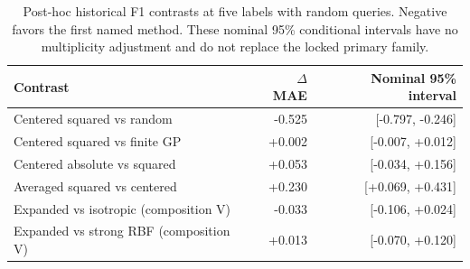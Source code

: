 \begin{table}[htbp]\centering\small
\caption{Post-hoc historical F1 contrasts at five labels with random queries. Negative favors the first named method. These nominal 95\% conditional intervals have no multiplicity adjustment and do not replace the locked primary family.}\label{tab:step10secondary}
\begin{tabular}{lrr}\toprule
Contrast & $\Delta$ MAE & Nominal 95\% interval \\ \midrule
Centered squared vs random & -0.525 & [-0.797, -0.246] \\
Centered squared vs finite GP & +0.002 & [-0.007, +0.012] \\
Centered absolute vs squared & +0.053 & [-0.034, +0.156] \\
Averaged squared vs centered & +0.230 & [+0.069, +0.431] \\
Expanded vs isotropic (composition V) & -0.033 & [-0.106, +0.024] \\
Expanded vs strong RBF (composition V) & +0.013 & [-0.070, +0.120] \\
\bottomrule\end{tabular}
\end{table}
